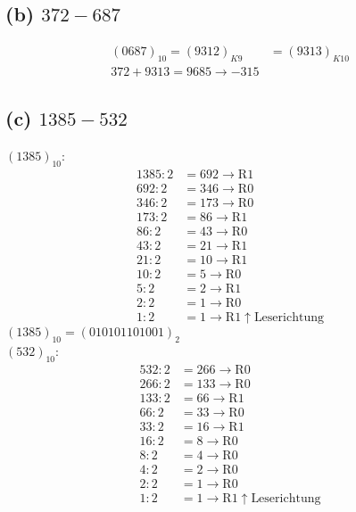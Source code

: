 \documentclass[11pt,a4paper]{article}
\begin{document}
\subsection*{(b) $372-687$}

\begin{align*}
(0687)_{10} = (9312)_{K9} &= (9313)_{K10}\\
372 + 9313 = 9685 \rightarrow -315
\end{align*}

\subsection*{(c) $1385-532$}

$(1385)_{10}$:
\begin{align*}
    1385:2 &= 692 \rightarrow \mbox{R}1 \\
    692:2 &= 346 \rightarrow \mbox{R}0 \\
    346:2 &= 173  \rightarrow \mbox{R}0 \\
    173:2 &= 86   \rightarrow \mbox{R}1 \\
    86:2 &= 43   \rightarrow \mbox{R}0 \\
    43:2 &= 21   \rightarrow \mbox{R}1 \\
    21:2 &= 10   \rightarrow \mbox{R}1 \\
    10:2 &= 5   \rightarrow \mbox{R}0 \\
    5:2 &= 2   \rightarrow \mbox{R}1 \\
    2:2 &= 1   \rightarrow \mbox{R}0 \\
    1:2 &= 1   \rightarrow \mbox{R}1 \uparrow \mbox{Leserichtung}
\end{align*}
$(1385)_{10}=(010101101001)_2$\\

$(532)_{10}$:
\begin{align*}
    532:2 &= 266 \rightarrow \mbox{R}0 \\
    266:2 &= 133 \rightarrow \mbox{R}0 \\
    133:2 &= 66  \rightarrow \mbox{R}1 \\
    66:2 &= 33   \rightarrow \mbox{R}0 \\
    33:2 &= 16   \rightarrow \mbox{R}1 \\
    16:2 &= 8   \rightarrow \mbox{R}0 \\
    8:2 &= 4   \rightarrow \mbox{R}0 \\
    4:2 &= 2   \rightarrow \mbox{R}0 \\
    2:2 &= 1   \rightarrow \mbox{R}0 \\
    1:2 &= 1   \rightarrow \mbox{R}1 \uparrow \mbox{Leserichtung}
\end{align*}
\end{document}
